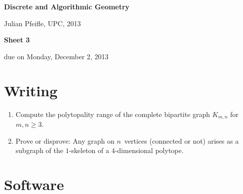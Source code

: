 \documentclass[11pt]{amsart}
\begin{document}
\begin{center}
\textbf{\sffamily
   Discrete and Algorithmic Geometry }

\medskip
   Julian Pfeifle,
   UPC, 2013 \mbox{}
\end{center}

\bigskip

\begin{center}
  \textbf{\sffamily Sheet 3}

\bigskip
 due on Monday, December 2, 2013

\end{center}

\bigskip



\section*{Writing}

\begin{enumerate}
\setlength{\itemsep}{2ex}

\item Compute the polytopality range of the complete bipartite graph $K_{m,n}$ for $m,n\ge3$.

\item Prove or disprove: Any graph on $n$~vertices (connected or not) arises as a subgraph of the $1$-skeleton of a $4$-dimensional polytope.
\end{enumerate}

 \bigskip
 \section*{Software}
\end{document}
